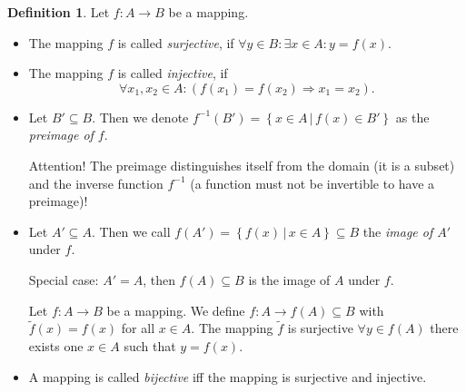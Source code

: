 \documentclass[a4paper,landscape,twocolumn]{article}
\theoremstyle{definition}
\newtheorem{defi}{Definition}
\newcommand\setdef[2]{\left\{#1\,|\,#2\right\}}
\begin{document}
\begin{defi}
  Let $f: A \rightarrow B$ be a mapping.
  \begin{itemize}
    \item
      The mapping $f$ is called \emph{surjective},
      if $\forall y \in B: \exists x \in A: y = f(x)$.
    \item
      The mapping $f$ is called \emph{injective}, if
      \[ \forall x_1, x_2 \in A: (f(x_1) = f(x_2) \Rightarrow x_1 = x_2). \]
    \item
      Let $B' \subseteq B$. Then we denote $f^{-1}(B') = \setdef{x \in A}{f(x) \in B'}$ as the \emph{preimage of $f$}.

      Attention! The preimage distinguishes itself from the domain (it is a subset)
      and the inverse function $f^{-1}$ (a function must not be invertible to have a preimage)!
    \item
      Let $A' \subseteq A$. Then we call $f(A') = \setdef{f(x)}{x \in A} \subseteq B$ the \emph{image of $A'$} under $f$.

      Special case: $A' = A$, then $f(A) \subseteq B$ is the image of $A$ under $f$.

      Let $f: A \rightarrow B$ be a mapping. We define $f: A \rightarrow f(A) \subseteq B$ with
      $\tilde f(x) = f(x)$ for all $x \in A$. The mapping $\tilde f$ is surjective $\forall y \in f(A)$ there exists one $x \in A$ such that $y = f(x)$.
    \item
      A mapping is called \emph{bijective}
      iff the mapping is surjective and injective.
  \end{itemize}
\end{defi}
\end{document}

